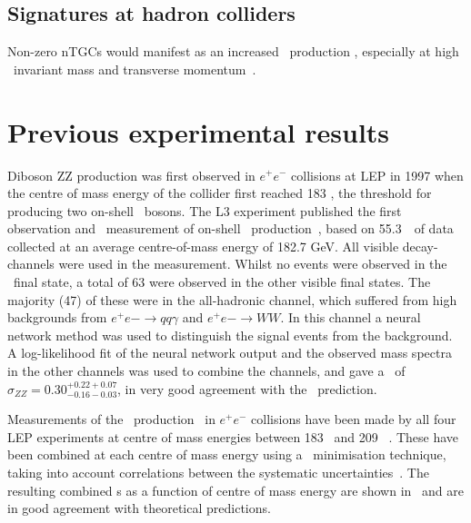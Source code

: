 \subsection{Signatures at hadron colliders}

Non-zero nTGCs would manifest as an increased \ZZ\
production \cx, especially at high \ZZ\ invariant mass and transverse
momentum~\cite{Baur:2000ae}.


%
\section{Previous experimental results}

Diboson ZZ production was first observed in $e^+e^-$ collisions at LEP in 1997
when the centre of mass energy of the collider first reached 183 \gev, the
threshold for producing two on-shell \Z\ bosons.
The L3 experiment published the first observation and \cx\ measurement
of on-shell \ZZ\ production~\cite{Acciarri1999281}, based on 55.3~\ipb\
of data collected at an average centre-of-mass energy of 182.7 GeV. All visible
decay-channels were used in the measurement. Whilst no events were
observed in the \llll\ final state, a total of 63 were observed in
the other visible final states. The majority (47) of these were in the
all-hadronic channel, which suffered from high backgrounds from $e^+e-
\rightarrow qq \gamma$ and $e^+e- \rightarrow WW$. In this channel a neural
network method was used to distinguish the signal events from the background. A
log-likelihood fit of the neural network output and the observed mass spectra in
the other channels was used to combine the channels, and gave a \cx\ of
$\sigma_{ZZ} = 0.30^{+0.22 +0.07}_{-0.16 -0.03}$, in very good agreement with
the \sm\ prediction. 

Measurements of the \ZZ\ production \cx\ in $e^+e^-$ collisions have
been made by all four LEP experiments at centre of mass energies between 183
\gev\ and 209
\gev~\cite{Abbiendi:2003va,Abdallah:2003dv,Acciarri:1999ug,Schael:1166743}.
These have been combined at each centre of mass energy using a \chisquared\
minimisation technique, taking into account correlations between the systematic
uncertainties~\cite{bib:LEPEW2006}. The resulting combined \cx s as a
function of centre of mass energy are shown in~\fig{lep-cx} and are in good agreement with
theoretical predictions.

